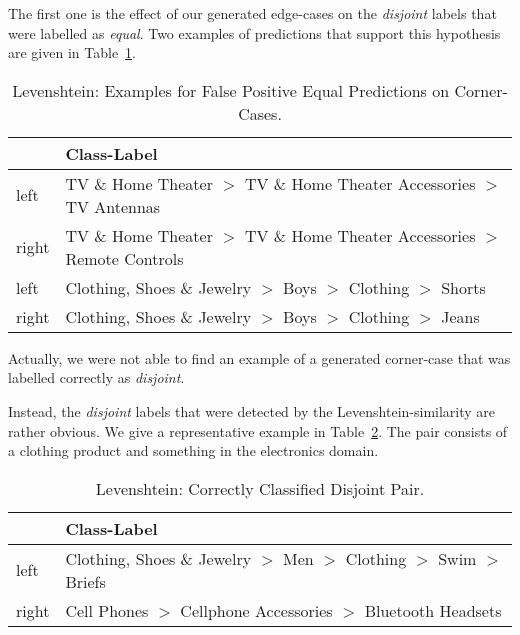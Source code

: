 The first one is the effect of our generated edge-cases on the \emph{disjoint} labels that were labelled as \emph{equal}.
Two examples of predictions that support this hypothesis are given in Table~\ref{tab:levenshtein-error1}.
\begin{table}[htbp]
    \begin{center}
        \begin{tabularx}{\textwidth}{lX}
            & Class-Label\\
            \hline
            left & TV \& Home Theater $>$ TV \& Home Theater Accessories $>$ TV Antennas \\
            right & TV \& Home Theater $>$ TV \& Home Theater Accessories $>$ Remote Controls \\
            \hline
            left & Clothing, Shoes \& Jewelry $>$ Boys $>$ Clothing $>$ Shorts \\
            right & Clothing, Shoes \& Jewelry $>$ Boys $>$ Clothing $>$ Jeans \\
        \end{tabularx}
        \caption{Levenshtein: Examples for False Positive Equal Predictions on Corner-Cases.}
        \label{tab:levenshtein-error1}
    \end{center}
\end{table}
Actually, we were not able to find an example of a generated corner-case that was labelled correctly as \emph{disjoint}.

Instead, the \emph{disjoint} labels that were detected by the Levenshtein-similarity are rather obvious.
We give a representative example in Table~\ref{tab:levenshtein-error2}.
The pair consists of a clothing product and something in the electronics domain.
\begin{table}[htbp]
    \begin{center}
        \begin{tabularx}{\textwidth}{lX}
            & Class-Label\\
            \hline
            left & Clothing, Shoes \& Jewelry $>$ Men $>$ Clothing $>$ Swim $>$ Briefs \\
            right & Cell Phones $>$ Cellphone Accessories $>$ Bluetooth Headsets \\
        \end{tabularx}
        \caption{Levenshtein: Correctly Classified Disjoint Pair.}
        \label{tab:levenshtein-error2}
    \end{center}
\end{table}

